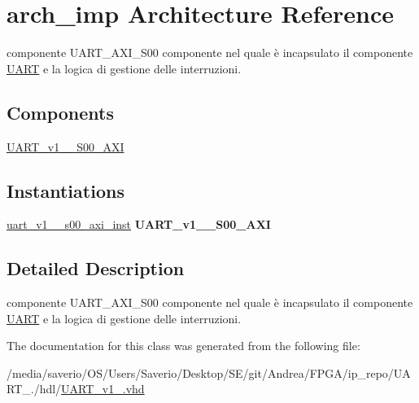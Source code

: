 \hypertarget{classUART__v1__0_1_1arch__imp}{}\section{arch\+\_\+imp Architecture Reference}
\label{classUART__v1__0_1_1arch__imp}


componente U\+A\+R\+T\+\_\+\+A\+X\+I\+\_\+\+S00  componente nel quale è incapsulato il componente \hyperlink{structUART}{U\+A\+RT} e la logica di gestione delle interruzioni.  


\subsection*{Components}
 \begin{DoxyCompactItemize}
\item 
\mbox{\label{classUART__v1__0_1_1arch__imp_a554bf35242758ea2c6cdb41b3a146b89}} 
\hyperlink{classUART__v1__0_1_1arch__imp_a554bf35242758ea2c6cdb41b3a146b89}{U\+A\+R\+T\+\_\+v1\+\_\+\_\+\+S00\+\_\+\+A\+XI}  {\bfseries }  
\end{DoxyCompactItemize}
\subsection*{Instantiations}
 \begin{DoxyCompactItemize}
\item 
\mbox{\label{classUART__v1__0_1_1arch__imp_af8995827bb89a3b54bf57d79330e4cf5}} 
\hyperlink{classUART__v1__0_1_1arch__imp_af8995827bb89a3b54bf57d79330e4cf5}{uart\+\_\+v1\+\_\+\_\+s00\+\_\+axi\+\_\+inst}  {\bfseries U\+A\+R\+T\+\_\+v1\+\_\+\_\+\+S00\+\_\+\+A\+XI}   
\end{DoxyCompactItemize}


\subsection{Detailed Description}
componente U\+A\+R\+T\+\_\+\+A\+X\+I\+\_\+\+S00  componente nel quale è incapsulato il componente \hyperlink{structUART}{U\+A\+RT} e la logica di gestione delle interruzioni. 

The documentation for this class was generated from the following file\+:\begin{DoxyCompactItemize}
\item 
/media/saverio/\+O\+S/\+Users/\+Saverio/\+Desktop/\+S\+E/git/\+Andrea/\+F\+P\+G\+A/ip\+\_\+repo/\+U\+A\+R\+T\+\_./hdl/\hyperlink{UART__v1__0_8vhd}{U\+A\+R\+T\+\_\+v1\+\_.\+vhd}\end{DoxyCompactItemize}

